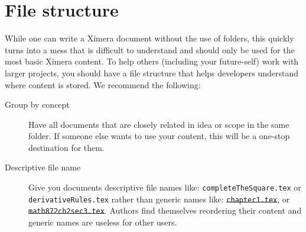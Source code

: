 \documentclass{ximera}
\begin{document}
\section{File structure}

While one can write a Ximera document without the use of folders, this quickly
turns into a mess that is difficult to understand and should only be used for
the most basic Ximera content.
To help others (including your future-self) work with larger projects, you
should have a file structure
that helps developers understand where content is stored. We recommend the
following:
\begin{description}
  \item[Group by concept] Have all documents that are closely related in idea
    or scope in the same folder. If someone else wants to use your content,
    this will be a one-stop destination for them.
  \item[Descriptive file name] Give you documents descriptive file names like:
    \verb!completeTheSquare.tex! or \verb!derivativeRules.tex! rather than
    generic
    names like: \sout{\texttt{chapter1.tex}}, or
    \sout{\texttt{math872ch2sec3.tex}}. Authors find themselves reordering
    their content and generic names are useless for other users.
\end{description}
\end{document}
